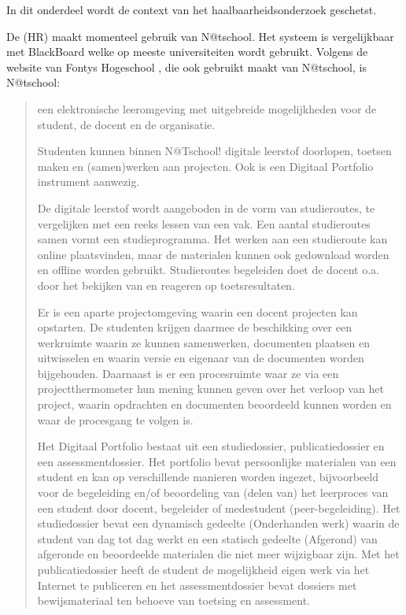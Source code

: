
In dit onderdeel wordt de context van het haalbaarheidsonderzoek
geschetst.


De \HR{} (HR) maakt momenteel gebruik van N@tschool. Het
systeem is vergelijkbaar met BlackBoard welke op meeste universiteiten
wordt gebruikt. Volgens de website van Fontys Hogeschool
\cite{fontis}, die ook gebruikt maakt van N@tschool, is N@tschool:

\begin{quotation} een elektronische leeromgeving met uitgebreide
mogelijkheden voor de student, de docent en de organisatie.

Studenten kunnen binnen N@Tschool! digitale leerstof doorlopen,
toetsen maken en (samen)werken aan projecten. Ook is een Digitaal
Portfolio instrument aanwezig.

De digitale leerstof wordt aangeboden in de vorm van studieroutes, te
vergelijken met een reeks lessen van een vak. Een aantal studieroutes
samen vormt een studieprogramma. Het werken aan een studieroute kan
online plaatsvinden, maar de materialen kunnen ook gedownload worden
en offline worden gebruikt. Studieroutes begeleiden doet de docent
o.a. door het bekijken van en reageren op toetsresultaten.

Er is een aparte projectomgeving waarin een docent projecten kan
opstarten. De studenten krijgen daarmee de beschikking over een
werkruimte waarin ze kunnen samenwerken, documenten plaatsen en
uitwisselen en waarin versie en eigenaar van de documenten worden
bijgehouden. Daarnaast is er een procesruimte waar ze via een
projectthermometer hun mening kunnen geven over het verloop van het
project, waarin opdrachten en documenten beoordeeld kunnen worden en
waar de procesgang te volgen is.

Het Digitaal Portfolio bestaat uit een studiedossier,
publicatiedossier en een assessmentdossier. Het portfolio bevat
persoonlijke materialen van een student en kan op verschillende
manieren worden ingezet, bijvoorbeeld voor de begeleiding en/of
beoordeling van (delen van) het leerproces van een student door
docent, begeleider of medestudent (peer-begeleiding). Het
studiedossier bevat een dynamisch gedeelte (Onderhanden werk) waarin
de student van dag tot dag werkt en een statisch gedeelte (Afgerond)
van afgeronde en beoordeelde materialen die niet meer wijzigbaar
zijn. Met het publicatiedossier heeft de student de mogelijkheid eigen
werk via het Internet te publiceren en het assessmentdossier bevat
dossiers met bewijsmateriaal ten behoeve van toetsing en assessment.


\end{quotation}
